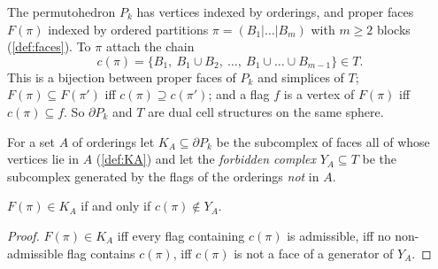 The permutohedron $P_k$ has vertices indexed by orderings, and proper faces $F(\pi)$ indexed by ordered partitions $\pi=(B_1|\dots|B_m)$ with $m\ge2$ blocks (\cref{def:faces}). To $\pi$ attach the chain
\[
c(\pi)=\{B_1,\ B_1\cup B_2,\ \dots,\ B_1\cup\dots\cup B_{m-1}\}\in T .
\]
This is a bijection between proper faces of $P_k$ and simplices of $T$; $F(\pi)\subseteq F(\pi')$ iff $c(\pi)\supseteq c(\pi')$; and a flag $f$ is a vertex of $F(\pi)$ iff $c(\pi)\subseteq f$. So $\partial P_k$ and $T$ are dual cell structures on the same sphere.
\begin{definition}\label{def:forbidden}
For a set $A$ of orderings let $K_A\subseteq\partial P_k$ be the subcomplex of faces all of whose vertices lie in $A$ (\cref{def:KA}) and let the \emph{forbidden complex} $Y_A\subseteq T$ be the subcomplex generated by the flags of the orderings \emph{not} in $A$.
\end{definition}
\begin{proposition}[dictionary]\label{prop:dict}
$F(\pi)\in K_A$ if and only if $c(\pi)\notin Y_A$.
\end{proposition}
\begin{proof}
$F(\pi)\in K_A$ iff every flag containing $c(\pi)$ is admissible, iff no non-admissible flag contains $c(\pi)$, iff $c(\pi)$ is not a face of a generator of $Y_A$.
\end{proof}

